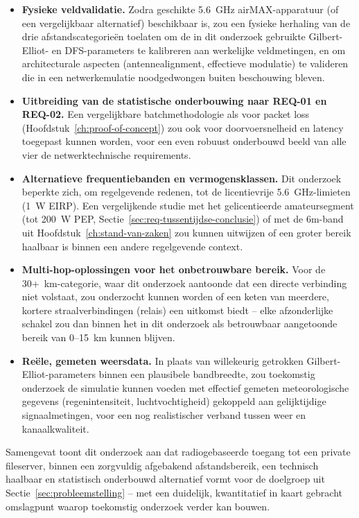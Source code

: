 \begin{itemize}
  \item \textbf{Fysieke veldvalidatie.} Zodra geschikte 5.6~GHz airMAX-apparatuur (of een
        vergelijkbaar alternatief) beschikbaar is, zou een fysieke herhaling van de
        drie afstandscategorieën toelaten om de in dit onderzoek gebruikte
        Gilbert-Elliot- en DFS-parameters te kalibreren aan werkelijke veldmetingen, en
        om architecturale aspecten (antennealignment, effectieve modulatie) te
        valideren die in een netwerkemulatie noodgedwongen buiten beschouwing bleven.
  \item \textbf{Uitbreiding van de statistische onderbouwing naar REQ-01 en REQ-02.} Een
        vergelijkbare batchmethodologie als voor packet loss (Hoofdstuk~\ref{ch:proof-of-concept})
        zou ook voor doorvoersnelheid en latency toegepast kunnen worden, voor een
        even robuust onderbouwd beeld van alle vier de netwerktechnische requirements.
  \item \textbf{Alternatieve frequentiebanden en vermogensklassen.} Dit onderzoek
        beperkte zich, om regelgevende redenen, tot de licentievrije 5.6~GHz-limieten
        (1~W EIRP). Een vergelijkende studie met het gelicentieerde amateursegment
        (tot 200~W PEP, Sectie~\ref{sec:req-tussentijdse-conclusie}) of met de 6m-band
        uit Hoofdstuk~\ref{ch:stand-van-zaken} zou kunnen uitwijzen of een groter bereik
        haalbaar is binnen een andere regelgevende context.
  \item \textbf{Multi-hop-oplossingen voor het onbetrouwbare bereik.} Voor de
        30+~km-categorie, waar dit onderzoek aantoonde dat een directe verbinding niet
        volstaat, zou onderzocht kunnen worden of een keten van meerdere, kortere
        straalverbindingen (relais) een uitkomst biedt -- elke afzonderlijke schakel
        zou dan binnen het in dit onderzoek als betrouwbaar aangetoonde bereik van
        0--15~km kunnen blijven.
  \item \textbf{Reële, gemeten weersdata.} In plaats van willekeurig getrokken
        Gilbert-Elliot-parameters binnen een plausibele bandbreedte, zou toekomstig
        onderzoek de simulatie kunnen voeden met effectief gemeten meteorologische
        gegevens (regenintensiteit, luchtvochtigheid) gekoppeld aan gelijktijdige
        signaalmetingen, voor een nog realistischer verband tussen weer en
        kanaalkwaliteit.
\end{itemize}
 
Samengevat toont dit onderzoek aan dat radiogebaseerde toegang tot een private
fileserver, binnen een zorgvuldig afgebakend afstandsbereik, een technisch haalbaar en
statistisch onderbouwd alternatief vormt voor de doelgroep uit
Sectie~\ref{sec:probleemstelling} -- met een duidelijk, kwantitatief in kaart gebracht
omslagpunt waarop toekomstig onderzoek verder kan bouwen.

